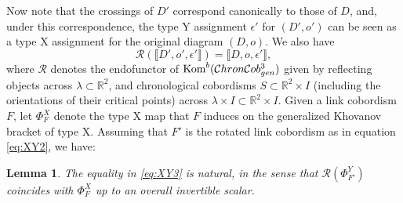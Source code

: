 \documentclass[12pt]{amsart}
\theoremstyle{definition}
\theoremstyle{plain}
\newtheorem{lemma}{Lemma}
\newcommand{\komb}[1]{\textnormal{Kom}^b(#1)}
\begin{document}
Now note that the crossings of $D'$ correspond canonically to those of $D$,
and, under this correspondence, the type Y assignment $\epsilon'$ for $(D',o')$ can be seen as a type X
assignment for the original diagram $(D,o)$. We also have
\begin{equation}\label{eq:XY3}
\mathcal{R}(\llbracket D',o',\epsilon'\rrbracket)=\llbracket D,o,\epsilon'\rrbracket,
\end{equation}
where $\mathcal{R}$ denotes the endofunctor of $\komb{\mathcal{C}hron\mathcal{C}ob^3_{gen}}$ given by reflecting
objects across $\lambda\subset\mathbb{R}^2$, and chronological cobordisms $S\subset\mathbb{R}^2\times I$ (including the orientations of their critical points)
across $\lambda\times I\subset\mathbb{R}^2\times I$.
Given a link cobordism $F$, let $\Phi^X_F$ denote the type X map that $F$ induces
on the generalized Khovanov bracket of type X.
Assuming that $F'$ is the rotated link cobordism as in equation \eqref{eq:XY2}, we have:

\begin{lemma}\label{lem:XY2}
The equality in \eqref{eq:XY3} is natural, in the sense that
$\mathcal{R}(\Phi^Y_{F'})$ coincides with $\Phi^X_F$ up to an overall invertible scalar.
\end{lemma}
\end{document}
